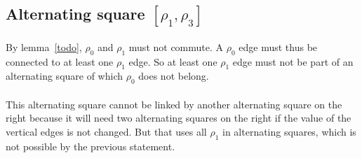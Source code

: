 \subsection{Alternating square $[\rho_1, \rho_3]$}

\begin{figure}[H]
  \begin{center}
    \caption{}
  \end{center}
\end{figure}

\paragraph{}
By lemma~\ref{todo}, $\rho_0$ and $\rho_1$ must not commute. A $\rho_0$ edge must thus be connected to at least one $\rho_1$ edge. So at least one $\rho_1$ edge must not be part of an alternating square of which $\rho_0$ does not belong.

\paragraph{}
This alternating square cannot be linked by another alternating square on the right because it will need two alternating squares on the right if the value of the vertical edges is not changed. But that uses all $\rho_1$ in alternating squares, which is not possible by the previous statement.

